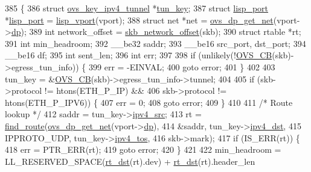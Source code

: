\begin{DoxyCode}
385 \{
386     \textcolor{keyword}{struct }\hyperlink{structovs__key__ipv4__tunnel}{ovs\_key\_ipv4\_tunnel} *\hyperlink{flow_8h_a904e9497acde49a1992636f77597c5c7}{tun\_key};
387     \textcolor{keyword}{struct }\hyperlink{structlisp__port}{lisp\_port} *\hyperlink{structlisp__port}{lisp\_port} = \hyperlink{vport-lisp_8c_af8f69fb0b9db12e9a324a9932011b302}{lisp\_vport}(vport);
388     \textcolor{keyword}{struct }net *net = \hyperlink{datapath_8h_aef2302004ca1f45133eaef00bb3740eb}{ovs\_dp\_get\_net}(vport->\hyperlink{structvport_a49fb6f6bf0ac4337853e9242e88ddc42}{dp});
389     \textcolor{keywordtype}{int} network\_offset = \hyperlink{skbuff_8h_aabe75b44039b11c1b7c6e2f246e7146e}{skb\_network\_offset}(skb);
390     \textcolor{keyword}{struct }rtable *rt;
391     \textcolor{keywordtype}{int} min\_headroom;
392     \_\_be32 saddr;
393     \_\_be16 src\_port, dst\_port;
394     \_\_be16 df;
395     \textcolor{keywordtype}{int} sent\_len;
396     \textcolor{keywordtype}{int} err;
397 
398     \textcolor{keywordflow}{if} (unlikely(!\hyperlink{datapath_8h_ac337c4d4ddca29916ce8e900038ddd78}{OVS\_CB}(skb)->egress\_tun\_info)) \{
399         err = -EINVAL;
400         \textcolor{keywordflow}{goto} error;
401     \}
402 
403     tun\_key = &\hyperlink{datapath_8h_ac337c4d4ddca29916ce8e900038ddd78}{OVS\_CB}(skb)->egress\_tun\_info->tunnel;
404 
405     \textcolor{keywordflow}{if} (skb->protocol != htons(ETH\_P\_IP) &&
406         skb->protocol != htons(ETH\_P\_IPV6)) \{
407         err = 0;
408         \textcolor{keywordflow}{goto} error;
409     \}
410 
411     \textcolor{comment}{/* Route lookup */}
412     saddr = tun\_key->\hyperlink{structovs__key__ipv4__tunnel_a1e5a978f104d61e9694e914a109734a7}{ipv4\_src};
413     rt = \hyperlink{compat_8h_a9fd71ce2d13a3dcc4f7d51469ba86d79}{find\_route}(\hyperlink{datapath_8h_aef2302004ca1f45133eaef00bb3740eb}{ovs\_dp\_get\_net}(vport->\hyperlink{structvport_a49fb6f6bf0ac4337853e9242e88ddc42}{dp}),
414             &saddr, tun\_key->\hyperlink{structovs__key__ipv4__tunnel_ae443d381a97f53bbc4139fe36c0aae30}{ipv4\_dst},
415             IPPROTO\_UDP, tun\_key->\hyperlink{structovs__key__ipv4__tunnel_a69594eaf9d7dfc2824b264484e02498e}{ipv4\_tos},
416             skb->mark);
417     \textcolor{keywordflow}{if} (IS\_ERR(rt)) \{
418         err = PTR\_ERR(rt);
419         \textcolor{keywordflow}{goto} error;
420     \}
421 
422     min\_headroom = LL\_RESERVED\_SPACE(\hyperlink{compat_8h_afce1864ee37be971c99555fdf1f76d88}{rt\_dst}(rt).dev) + \hyperlink{compat_8h_afce1864ee37be971c99555fdf1f76d88}{rt\_dst}(rt).header\_len

\end{DoxyCode}
